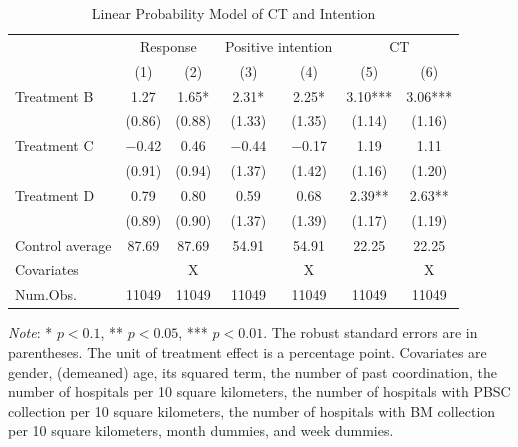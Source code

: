 \documentclass [12pt, a4paper]{article}
\begin{document}
\begin{table}

\caption{\label{tab:stock-reg}Linear Probability Model of CT and Intention}
\centering
\fontsize{9}{11}\selectfont
\begin{threeparttable}
\begin{tabular}[t]{lcccccc}
\toprule
\multicolumn{1}{c}{ } & \multicolumn{2}{c}{Response} & \multicolumn{2}{c}{Positive intention} & \multicolumn{2}{c}{CT} \\
\cmidrule(l{3pt}r{3pt}){2-3} \cmidrule(l{3pt}r{3pt}){4-5} \cmidrule(l{3pt}r{3pt}){6-7}
  & (1) & (2) & (3) & (4) & (5) & (6)\\
\midrule
Treatment B & \num{1.27} & \num{1.65}* & \num{2.31}* & \num{2.25}* & \num{3.10}*** & \num{3.06}***\\
 & (\num{0.86}) & (\num{0.88}) & (\num{1.33}) & (\num{1.35}) & (\num{1.14}) & (\num{1.16})\\
Treatment C & \num{-0.42} & \num{0.46} & \num{-0.44} & \num{-0.17} & \num{1.19} & \num{1.11}\\
 & (\num{0.91}) & (\num{0.94}) & (\num{1.37}) & (\num{1.42}) & (\num{1.16}) & (\num{1.20})\\
Treatment D & \num{0.79} & \num{0.80} & \num{0.59} & \num{0.68} & \num{2.39}** & \num{2.63}**\\
 & (\num{0.89}) & (\num{0.90}) & (\num{1.37}) & (\num{1.39}) & (\num{1.17}) & (\num{1.19})\\
\midrule
Control average & 87.69 & 87.69 & 54.91 & 54.91 & 22.25 & 22.25\\
Covariates &  & X &  & X &  & X\\
Num.Obs. & \num{11049} & \num{11049} & \num{11049} & \num{11049} & \num{11049} & \num{11049}\\
\bottomrule
\end{tabular}
\begin{tablenotes}
\item \emph{Note}: * $p < 0.1$, ** $p < 0.05$, *** $p < 0.01$. The robust standard errors are in parentheses. The unit of treatment effect is a percentage point. Covariates are gender, (demeaned) age, its squared term, the number of past coordination, the number of hospitals per 10 square kilometers, the number of hospitals with PBSC collection per 10 square kilometers, the number of hospitals with BM collection per 10 square kilometers, month dummies, and week dummies.
\end{tablenotes}
\end{threeparttable}
\end{table}
\end{document}
